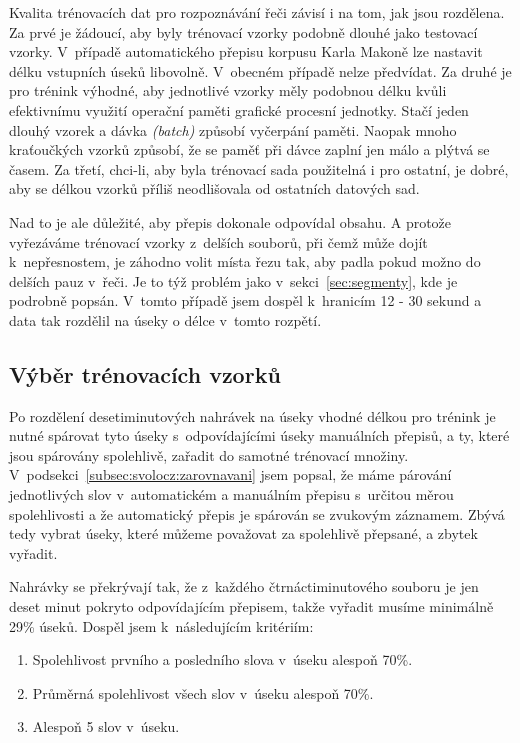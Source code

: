 Kvalita trénovacích dat pro rozpoznávání řeči závisí i na tom, jak jsou
rozdělena. Za prvé je žádoucí, aby byly trénovací vzorky podobně dlouhé
jako testovací vzorky\cite{nagorski2003search}.
V~případě automatického přepisu korpusu Karla Makoně lze
nastavit délku vstupních úseků libovolně. V~obecném případě nelze předvídat.
Za druhé je pro trénink výhodné, aby jednotlivé vzorky měly podobnou délku kvůli
efektivnímu využití operační paměti grafické procesní jednotky. Stačí jeden
dlouhý vzorek a dávka {\em (batch)} způsobí vyčerpání paměti. Naopak mnoho
kraťoučkých vzorků způsobí, že se paměť při dávce zaplní jen málo a plýtvá se
časem. Za třetí, chci-li, aby byla trénovací sada použitelná i pro ostatní,
je dobré, aby se délkou vzorků příliš neodlišovala od ostatních datových sad.

Nad to je ale důležité, aby přepis dokonale odpovídal obsahu. A protože
vyřezáváme trénovací vzorky z~delších souborů, při čemž může dojít
k~nepřesnostem, je záhodno volit místa řezu tak, aby padla pokud možno do
delších pauz v~řeči. Je to týž problém jako v~sekci~\ref{sec:segmenty}, kde je
podrobně popsán. V~tomto
případě jsem dospěl k~hranicím 12 - 30 sekund a data tak rozdělil na úseky o
délce v~tomto rozpětí.

\subsection{Výběr trénovacích vzorků}

Po rozdělení desetiminutových nahrávek na úseky vhodné délkou pro trénink je
nutné spárovat tyto úseky s~odpovídajícími úseky manuálních přepisů, a ty, které
jsou spárovány spolehlivě, zařadit do samotné trénovací množiny.
V~podsekci~\ref{subsec:svolocz:zarovnavani} jsem popsal, že máme párování
jednotlivých slov v~automatickém a manuálním přepisu s~určitou měrou
spolehlivosti a že automatický přepis je spárován se zvukovým záznamem. Zbývá
tedy vybrat úseky, které můžeme považovat za spolehlivě přepsané, a zbytek
vyřadit.

Nahrávky se překrývají tak, že z~každého čtrnáctiminutového souboru je jen deset
minut pokryto odpovídajícím přepisem, takže vyřadit musíme minimálně 29\% úseků.
Dospěl jsem k~následujícím kritériím:

\begin{enumerate}
\item{Spolehlivost prvního a posledního slova v~úseku alespoň 70\%.}
\item{Průměrná spolehlivost všech slov v~úseku alespoň 70\%.}
\item{Alespoň 5 slov v~úseku.}
\end{enumerate}

